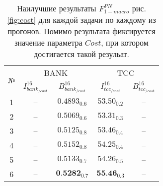 \begin{table}[htp!]
\centering
\caption{Наилучшие результаты $F_{1-macro}^{PN}$ рис. \ref{fig:cost}
    для каждой задачи по каждому из прогонов.
    Помимо результата фиксируется значение параметра $Cost$, при котором
    достигается такой резульат.
}
\label{table:cost}
\begin{tabular}{ccccc}
\hline
\multicolumn{1}{c|}{\multirow{2}{*}{№}} & \multicolumn{2}{c|}{BANK}                                                   & \multicolumn{2}{c}{TCC}                                           \\ \cline{2-5}
\multicolumn{1}{c|}{}                   & \multicolumn{1}{c|}{$I_{bank_{/cost}}^{16}$} & \multicolumn{1}{c|}{$B_{bank_{/cost}}^{16}$} & \multicolumn{1}{c|}{$I_{tcc_{/cost}}^{16}$}  & $B_{tcc_{/cost}}^{16}$             \\ \hline
1                                       & --                                           &  $0.4893_{0.6}$                              & $53.50_{0.2}$                                & --                         \\
2                                       & --                                           &  $0.5069_{0.6}$                              & $53.31_{0.3}$                                & --                         \\
3                                       & --                                           &  $0.5125_{0.8}$                              & $53.46_{0.4}$                                & --                         \\
4                                       & --                                           &  $0.5152_{0.8}$                              & $54.25_{0.4}$                                & --                         \\
5                                       & --                                           &  $0.5133_{0.7}$                              & $54.26_{0.5}$                                & --                         \\
6                                       & --                                           &  $\textbf{0.5282}_{0.7}$                     & $\textbf{55.46}_{0.3}$                       & --                         \\ \hline
\end{tabular}
\end{table}

